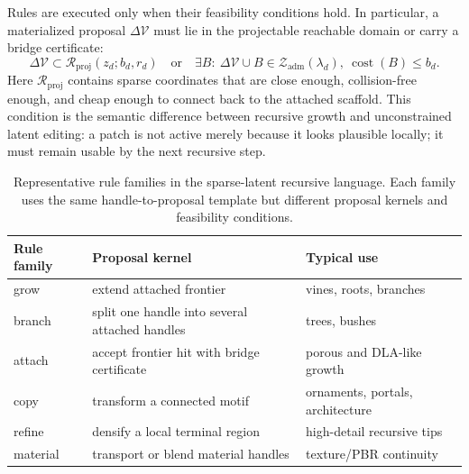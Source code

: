 Rules are executed only when their feasibility conditions hold. In particular,
a materialized proposal \(\Delta\mathcal V\) must lie in the projectable
reachable domain or carry a bridge certificate:
\begin{equation}
\Delta\mathcal V\subset
\mathcal R_{\mathrm{proj}}(z_d;b_d,r_d)
\quad\mathrm{or}\quad
\exists B:\ \Delta\mathcal V\cup B\in\mathcal Z_{\mathrm{adm}}(\lambda_d),
\ \operatorname{cost}(B)\le b_d.
\end{equation}
Here \(\mathcal R_{\mathrm{proj}}\) contains sparse coordinates that are close
enough, collision-free enough, and cheap enough to connect back to the attached
scaffold. This condition is the semantic difference between recursive growth
and unconstrained latent editing: a patch is not active merely because it looks
plausible locally; it must remain usable by the next recursive step.

\begin{table}[t]
  \centering
  \caption{Representative rule families in the sparse-latent recursive
  language. Each family uses the same handle-to-proposal template but different
  proposal kernels and feasibility conditions.}
  \label{tab:rule-families-draft}
  \begin{tabular}{lll}
    \toprule
    Rule family & Proposal kernel & Typical use \\
    \midrule
    grow & extend attached frontier & vines, roots, branches \\
    branch & split one handle into several attached handles & trees, bushes \\
    attach & accept frontier hit with bridge certificate & porous and DLA-like growth \\
    copy & transform a connected motif & ornaments, portals, architecture \\
    refine & densify a local terminal region & high-detail recursive tips \\
    material & transport or blend material handles & texture/PBR continuity \\
    \bottomrule
  \end{tabular}
\end{table}

